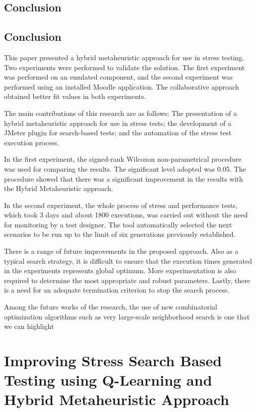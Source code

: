 \documentclass{report}
\begin{document}
\vspace*{-.075in}
\section{Conclusion}
\vspace*{-.075in}

\section{Conclusion}

This paper presented a hybrid metaheuristic approach for use in stress testing. Two experiments were performed to validate the solution. The first experiment was performed on an emulated component, and the second experiment was performed using an installed Moodle application.  The collaborative approach obtained better fit values in both experiments. 

The main contributions of this research are as follows: The presentation of a hybrid metaheuristic approach for use in stress tests; the development of a JMeter plugin  for search-based tests; and  the automation of the stress test execution process.  

In the first experiment, the signed-rank Wilcoxon non-parametrical procedure was used for comparing the results. The significant level adopted was 0.05. The procedure showed that there was a significant improvement in the results with the Hybrid Metaheuristic approach.

In the second experiment, the whole process of stress and performance tests, which took 3 days and about 1800 executions, was carried out without the need for monitoring by a test designer. The tool automatically selected the next scenarios to be run up to the limit of six generations previously established. 

There is a range of future improvements in the proposed approach. Also as a typical search strategy, it is difficult to ensure that the execution times generated in the experiments represents global optimum. More experimentation is also required to determine the
most appropriate and robust parameters. Lastly, there is a need for an adequate termination criterion to stop the search process.

Among the future works of the research, the use of new combinatorial optimization algorithms such as very large-scale neighborhood search is one that we can highlight


\chapter{Improving Stress Search Based Testing using Q-Learning and Hybrid Metaheuristic Approach}
\end{document}
